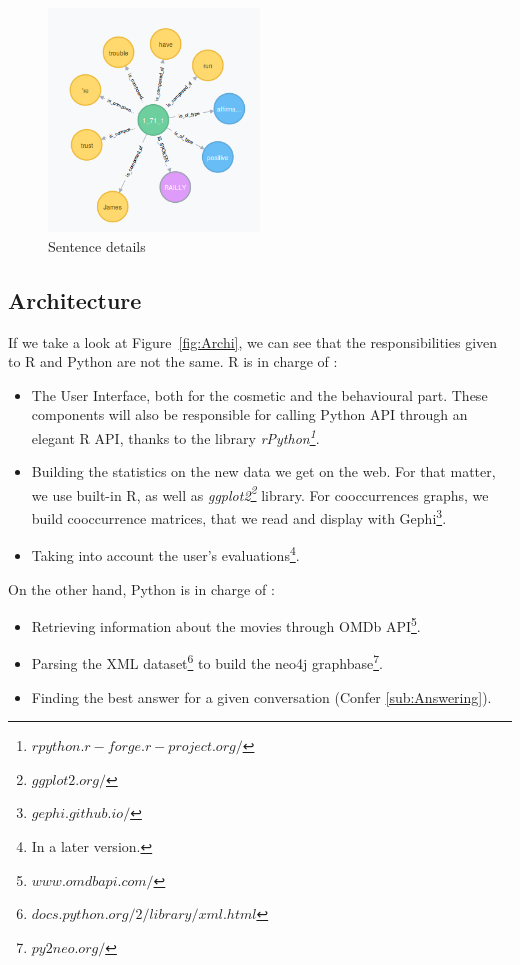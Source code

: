 \begin{figure}[!h]
\begin{center}
\includegraphics[width=0.5\textwidth]{./img/graph1711.png}
\end{center}
\caption{Sentence details}
\label{fig:sent}
\end{figure}

\subsection{Architecture}
\label{sub:Architecture}

If we take a look at Figure~\ref{fig:Archi}, we can see that the responsibilities given to R and Python are not the same.
R is in charge of :
\begin{itemize}
    \item The User Interface, both for the cosmetic and the behavioural part.
    These components will also be responsible for calling Python API through an elegant R API, thanks to the library \textit{rPython\footnote{$rpython.r-forge.r-project.org/$}}.
    \item Building the statistics on the new data we get on the web.
    For that matter, we use built-in R, as well as \textit{ggplot2\footnote{$ggplot2.org/$}} library.
    For cooccurrences graphs, we build cooccurrence matrices, that we read and display with Gephi\footnote{$gephi.github.io/$}.
    \item Taking into account the user's evaluations\footnote{In a later version.}.
\end{itemize}

On the other hand, Python is in charge of :
\begin{itemize}
    \item Retrieving information about the movies through OMDb API\footnote{$www.omdbapi.com/$}.
    \item Parsing the XML dataset\footnote{$docs.python.org/2/library/xml.html$} to build the neo4j graphbase\footnote{$py2neo.org/$}.
    \item Finding the best answer for a given conversation (Confer \ref{sub:Answering}).
\end{itemize}

